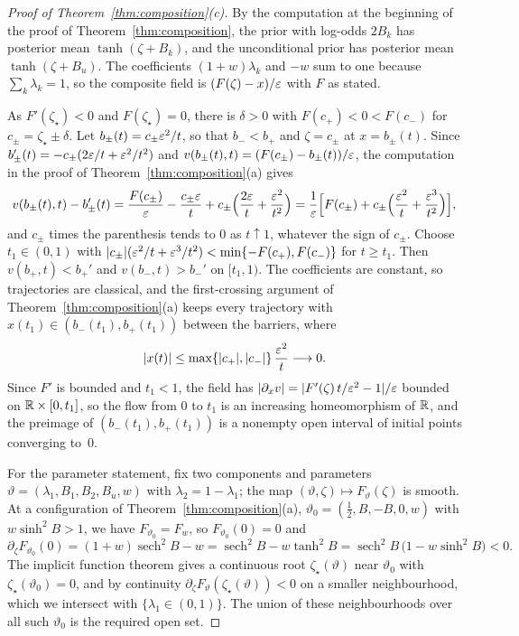 \documentclass{article} %
\makeatletter
\newif\ificlr
\newcommand{\placeblock}[1]{\ificlr\@nameuse{moved@#1}\fi}
\theoremstyle{plain}
\theoremstyle{definition}
\theoremstyle{remark}
\makeatother
\begin{document}
\label{apx:pf-composition-open}
\begin{proof}[Proof of Theorem~\ref{thm:composition}(c)]
By the computation at the beginning of the proof of Theorem~\ref{thm:composition}, the prior with
log-odds $2B_k$ has posterior mean $\tanh(\zeta+B_k)$, and the unconditional prior has posterior mean
$\tanh(\zeta+B_u)$. The coefficients $(1+w)\lambda_k$ and $-w$ sum to one because
$\sum_k\lambda_k=1$, so the composite field is $(F(\zeta)-x)/\varepsilon$ with $F$ as stated.

As $F'(\zeta_\star)<0$ and $F(\zeta_\star)=0$, there is $\delta>0$ with $F(c_+)<0<F(c_-)$ for
$c_\pm=\zeta_\star\pm\delta$. Let $b_\pm(t)=c_\pm\varepsilon^2/t$, so that $b_-<b_+$ and $\zeta=c_\pm$ at
$x=b_\pm(t)$. Since $b_\pm'(t)=-c_\pm(2\varepsilon/t+\varepsilon^2/t^2)$ and
$v(b_\pm(t),t)=(F(c_\pm)-b_\pm(t))/\varepsilon$, the computation in the proof of
Theorem~\ref{thm:composition}(a) gives
\[
v(b_\pm(t),t)-b_\pm'(t)
=\frac{F(c_\pm)}{\varepsilon}-\frac{c_\pm\varepsilon}{t}+c_\pm\Bigl(\frac{2\varepsilon}t+\frac{\varepsilon^2}{t^2}\Bigr)
=\frac1{\varepsilon}\Bigl[F(c_\pm)+c_\pm\Bigl(\frac{\varepsilon^2}t+\frac{\varepsilon^3}{t^2}\Bigr)\Bigr],
\]
and $c_\pm$ times the parenthesis tends to $0$ as $t\uparrow1$, whatever the sign of $c_\pm$.
Choose $t_1\in(0,1)$ with $|c_\pm|(\varepsilon^2/t+\varepsilon^3/t^2)<\min\{-F(c_+),F(c_-)\}$ for $t\ge t_1$.
Then $v(b_+,t)<b_+'$ and $v(b_-,t)>b_-'$ on $[t_1,1)$. The coefficients are constant, so
trajectories are classical, and the first-crossing argument of Theorem~\ref{thm:composition}(a)
keeps every trajectory with $x(t_1)\in(b_-(t_1),b_+(t_1))$ between the barriers, where
\[
|x(t)|\le\max\{|c_+|,|c_-|\}\,\frac{\varepsilon^2}{t}\longrightarrow0 .
\]
Since $F'$ is bounded and $t_1<1$, the field has $|\partial_xv|=|F'(\zeta)\,t/\varepsilon^2-1|/\varepsilon$ bounded on
$\mathbb{R}\times[0,t_1]$, so the flow from $0$ to $t_1$ is an increasing homeomorphism of $\mathbb{R}$, and the
preimage of $(b_-(t_1),b_+(t_1))$ is a nonempty open interval of initial points converging to~$0$.

For the parameter statement, fix two components and parameters
$\vartheta=(\lambda_1,B_1,B_2,B_u,w)$ with $\lambda_2=1-\lambda_1$; the map
$(\vartheta,\zeta)\mapsto F_\vartheta(\zeta)$ is smooth. At a configuration of
Theorem~\ref{thm:composition}(a), $\vartheta_0=(\tfrac12,B,-B,0,w)$ with $w\sinh^2B>1$, we have
$F_{\vartheta_0}=F_w$, so $F_{\vartheta_0}(0)=0$ and
\[
\partial_\zeta F_{\vartheta_0}(0)=(1+w)\operatorname{sech}^2B-w
=\operatorname{sech}^2B-w\tanh^2B
=\operatorname{sech}^2B\,\bigl(1-w\sinh^2B\bigr)<0 .
\]
The implicit function theorem gives a continuous root $\zeta_\star(\vartheta)$ near $\vartheta_0$ with
$\zeta_\star(\vartheta_0)=0$, and by continuity $\partial_\zeta F_\vartheta(\zeta_\star(\vartheta))<0$ on a smaller
neighbourhood, which we intersect with $\{\lambda_1\in(0,1)\}$. The union of these neighbourhoods
over all such $\vartheta_0$ is the required open set.
\end{proof}
\placeblock{compopen}
\end{document}
